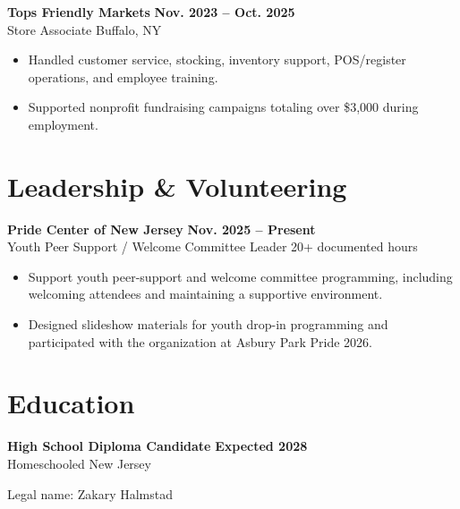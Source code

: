 \documentclass[10pt,letterpaper]{article}
\newcommand{\resumeItem}[1]{\item #1}
\newcommand{\resumeSubheading}[4]{%
  \textbf{#1} \hfill \textbf{#2}\\[-1pt]
  {\small #3} \hfill {\small #4}
}
\begin{document}
\resumeSubheading{Tops Friendly Markets}{Nov. 2023 -- Oct. 2025}{Store Associate}{Buffalo, NY}
\begin{itemize}
  \resumeItem{Handled customer service, stocking, inventory support, POS/register operations, and employee training.}
  \resumeItem{Supported nonprofit fundraising campaigns totaling over \$3,000 during employment.}
\end{itemize}

\section{Leadership \& Volunteering}

\resumeSubheading{Pride Center of New Jersey}{Nov. 2025 -- Present}{Youth Peer Support / Welcome Committee Leader}{20+ documented hours}
\begin{itemize}
  \resumeItem{Support youth peer-support and welcome committee programming, including welcoming attendees and maintaining a supportive environment.}
  \resumeItem{Designed slideshow materials for youth drop-in programming and participated with the organization at Asbury Park Pride 2026.}
\end{itemize}

\section{Education}

\resumeSubheading{High School Diploma Candidate}{Expected 2028}{Homeschooled}{New Jersey}

%
%
%

\vfill
{\footnotesize\color{gray}Legal name: Zakary Halmstad}
\end{document}
